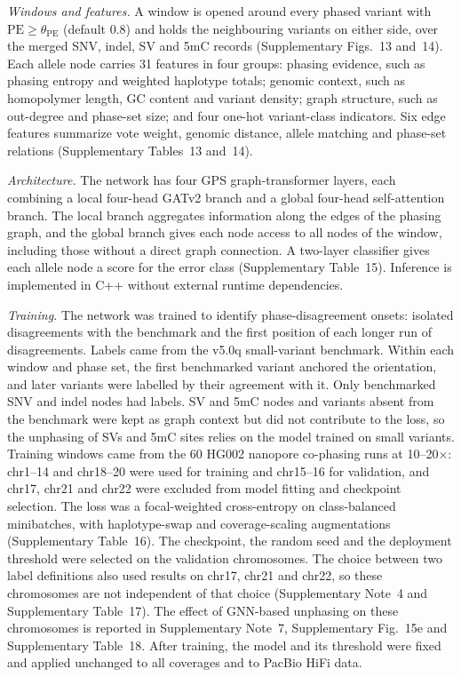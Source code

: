 \emph{Windows and features.}  A window is opened around every phased variant with $\mathrm{PE}\ge\theta_{\mathrm{PE}}$ (default 0.8) and holds the neighbouring variants on either side, over the merged SNV, indel, SV and 5mC records (Supplementary Figs.~13 and~14).  Each allele node carries 31 features in four groups: phasing evidence, such as phasing entropy and weighted haplotype totals; genomic context, such as homopolymer length, GC content and variant density; graph structure, such as out-degree and phase-set size; and four one-hot variant-class indicators.  Six edge features summarize vote weight, genomic distance, allele matching and phase-set relations (Supplementary Tables~13 and~14).

\emph{Architecture.}  The network has four GPS graph-transformer layers\cite{rampasek2022gps}, each combining a local four-head GATv2 branch\cite{velickovic2018gat,brody2022gatv2} and a global four-head self-attention branch\cite{vaswani2017attention}.  The local branch aggregates information along the edges of the phasing graph, and the global branch gives each node access to all nodes of the window, including those without a direct graph connection.  A two-layer classifier gives each allele node a score for the error class (Supplementary Table~15).  Inference is implemented in C++ without external runtime dependencies.

\emph{Training.}  The network was trained to identify phase-disagreement onsets: isolated disagreements with the benchmark and the first position of each longer run of disagreements.  Labels came from the v5.0q small-variant benchmark.  Within each window and phase set, the first benchmarked variant anchored the orientation, and later variants were labelled by their agreement with it.  Only benchmarked SNV and indel nodes had labels.  SV and 5mC nodes and variants absent from the benchmark were kept as graph context but did not contribute to the loss, so the unphasing of SVs and 5mC sites relies on the model trained on small variants.  Training windows came from the 60 HG002 nanopore co-phasing runs at 10--20$\times$: chr1--14 and chr18--20 were used for training and chr15--16 for validation, and chr17, chr21 and chr22 were excluded from model fitting and checkpoint selection.  The loss was a focal-weighted cross-entropy\cite{lin2017focal} on class-balanced minibatches, with haplotype-swap and coverage-scaling augmentations (Supplementary Table~16).  The checkpoint, the random seed and the deployment threshold were selected on the validation chromosomes.  The choice between two label definitions also used results on chr17, chr21 and chr22, so these chromosomes are not independent of that choice (Supplementary Note~4 and Supplementary Table~17).  The effect of GNN-based unphasing on these chromosomes is reported in Supplementary Note~7, Supplementary Fig.~15e and Supplementary Table~18.  After training, the model and its threshold were fixed and applied unchanged to all coverages and to PacBio HiFi data.

